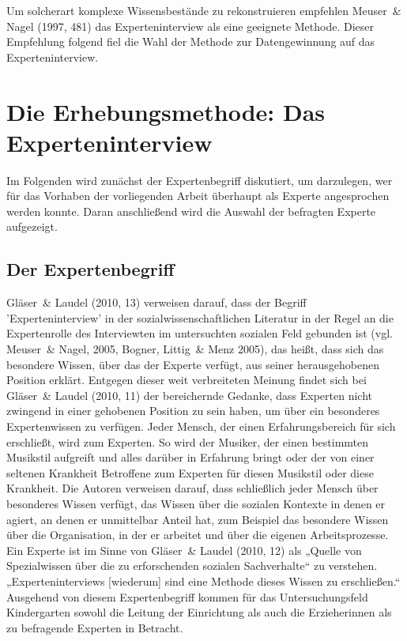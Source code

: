 Um solcherart komplexe Wissensbestände zu rekonstruieren empfehlen Meuser~\& Nagel (1997, 481) das Experteninterview als eine geeignete Methode. Dieser Empfehlung folgend fiel die Wahl der Methode zur Datengewinnung auf das Experteninterview. 


\section{Die Erhebungsmethode: Das Experteninterview}
Im Folgenden wird zunächst der Expertenbegriff diskutiert, um darzulegen, wer für das Vorhaben der vorliegenden Arbeit überhaupt als Experte angesprochen werden konnte.
Daran anschließend wird die Auswahl der befragten Experte aufgezeigt. 

\subsection{Der Expertenbegriff}
Gläser~\& Laudel (2010, 13) verweisen darauf, dass der Begriff ’Experteninterview’ in der sozialwissenschaftlichen Literatur in der Regel an die Expertenrolle des Interviewten im untersuchten sozialen Feld gebunden ist (vgl. Meuser~\& Nagel, 2005, Bogner, Littig~\& Menz 2005), das heißt, dass sich das besondere Wissen, über das der Experte verfügt, aus seiner herausgehobenen Position erklärt. Entgegen dieser weit verbreiteten Meinung findet sich bei Gläser~\& Laudel (2010, 11) der bereichernde Gedanke, dass Experten nicht zwingend in einer gehobenen Position zu sein haben, um über ein besonderes Expertenwissen zu verfügen. Jeder Mensch, der einen Erfahrungsbereich für sich erschließt, wird zum Experten. So wird der Musiker, der einen bestimmten Musikstil aufgreift und alles darüber in Erfahrung bringt oder der von einer seltenen Krankheit Betroffene zum Experten für diesen Musikstil oder diese Krankheit. Die Autoren verweisen darauf, dass schließlich jeder Mensch über besonderes Wissen verfügt, das Wissen über die sozialen Kontexte in denen er agiert, an denen er unmittelbar Anteil hat, zum Beispiel das besondere Wissen über die Organisation, in der er arbeitet und über die eigenen Arbeitsprozesse. Ein Experte ist im Sinne von Gläser~\& Laudel (2010, 12) als „Quelle von Spezialwissen über die zu erforschenden sozialen Sachverhalte“ zu verstehen. „Experteninterviews [wiederum] sind eine Methode dieses Wissen zu erschließen.“ Ausgehend von diesem Expertenbegriff kommen für das Untersuchungsfeld Kindergarten sowohl die Leitung der Einrichtung als auch die Erzieherinnen als zu befragende Experten in Betracht. 
 
